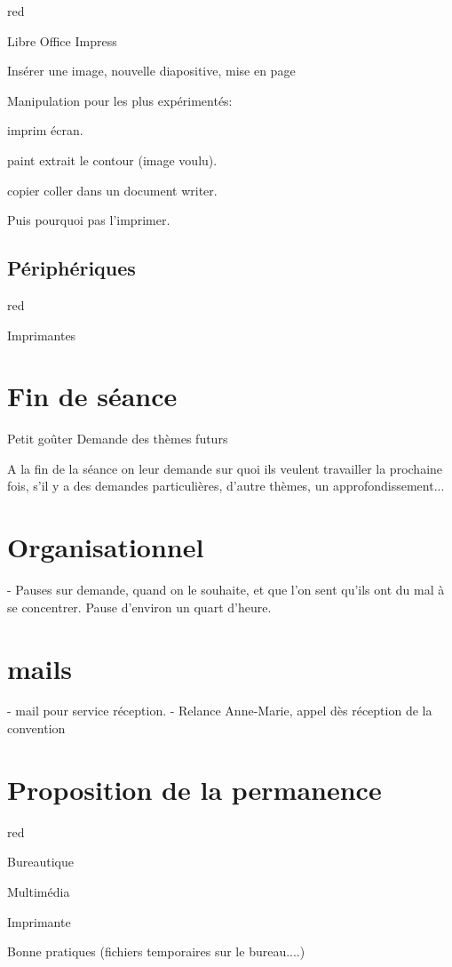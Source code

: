{\begin{items}{red}{\Circle}
\item Libre Office Impress
\item Insérer une image, nouvelle diapositive, mise en page
\end{items}

Manipulation pour les plus expérimentés:

imprim écran.

paint extrait le contour (image voulu).

copier coller dans un document writer.

Puis pourquoi pas l'imprimer.


\subsection{Périphériques}

\begin{items}{red}{\Circle}
\item Imprimantes
\end{items}
\section{Fin de séance}

Petit goûter 
Demande des thèmes futurs



A la fin de la séance on leur demande sur quoi ils veulent travailler la prochaine fois, s'il y a des demandes particulières, d'autre thèmes, un approfondissement... 


\section{Organisationnel}

- Pauses sur demande, quand on le souhaite, et que l'on sent qu'ils ont du mal à se concentrer. Pause d'environ un quart d'heure.


\section{mails}

- mail pour service réception.
- Relance Anne-Marie, appel dès réception de la convention


\section{Proposition de la permanence}

\begin{items}{red}{\Circle}
\item Bureautique
\item Multimédia
\item Imprimante
\item Bonne pratiques (fichiers temporaires sur le bureau....)
\end{items}



}
